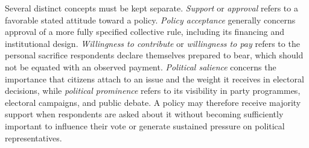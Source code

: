 \documentclass[11pt,a4paper]{article}
\begin{document}
Several distinct concepts must be kept separate. \emph{Support} or \emph{approval} refers to a favorable stated attitude toward a policy. \emph{Policy acceptance} generally concerns approval of a more fully specified collective rule, including its financing and institutional design. \emph{Willingness to contribute} or \emph{willingness to pay} refers to the personal sacrifice respondents declare themselves prepared to bear, which should not be equated with an observed payment. \emph{Political salience} concerns the importance that citizens attach to an issue and the weight it receives in electoral decisions, while \emph{political prominence} refers to its visibility in party programmes, electoral campaigns, and public debate. A policy may therefore receive majority support when respondents are asked about it without becoming sufficiently important to influence their vote or generate sustained pressure on political representatives.
\end{document}
